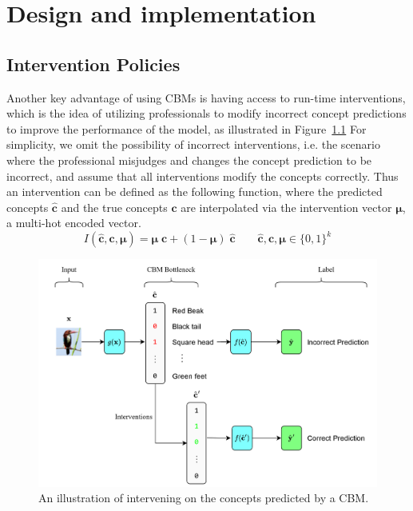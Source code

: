 \documentclass[../main.tex]{subfiles}
\begin{document}
\chapter{Design and implementation}


\section{Intervention Policies}

Another key advantage of using CBMs is having access to 
run-time interventions, which is the idea of utilizing professionals
to modify incorrect concept predictions to improve the 
performance of the model, as illustrated in Figure~\ref{fig:cbm-interventions} For simplicity, we omit the
possibility of incorrect interventions, i.e. the scenario
where the professional misjudges and changes the concept prediction to be incorrect,
and assume that
all interventions modify the concepts correctly. Thus an intervention
can be defined as the following function, where
the predicted concepts $\hat{\mathbf{c}}$ and the true concepts $\mathbf{c}$ are interpolated
via the intervention vector $\bm{\mu}$, a multi-hot encoded vector.
\[I(\hat{\mathbf{c}}, \mathbf{c}, \bm{\mu}) = 
\bm{\mu} \; \mathbf{c} + (1 - \bm{\mu}) \; \hat{\mathbf{c}} \qquad \hat{\mathbf{c}}, \mathbf{c}, \bm{\mu} \in \{0, 1\}^k\]

\begin{figure}[!h]
    \centering
    \includegraphics[width=\textwidth]{figs/background/cbm_interventions.png}
    \caption{An illustration of intervening on the concepts predicted by a CBM.}
    \label{fig:cbm-interventions}
\end{figure}
\end{document}
